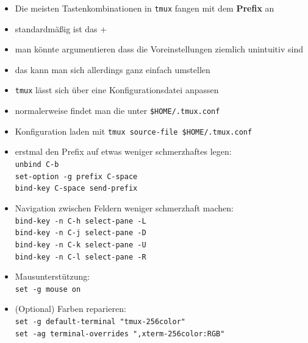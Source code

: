 \documentclass[plain]{beamer}
\newcommand{\prefix}{\Ctrl+\keystroke{b}}
\newcommand{\tmux}{\texttt{tmux}}
\begin{document}
\begin{frame}
  \begin{itemize}
    \item Die meisten Tastenkombinationen in \tmux{} fangen mit dem \textbf{Prefix} an
    \item standardmäßig ist das \prefix
    \item man könnte argumentieren dass die Voreinstellungen ziemlich unintuitiv sind
    \item das kann man sich allerdings ganz einfach umstellen
  \end{itemize}
\end{frame}

\begin{frame}
  \begin{itemize}
    \item \tmux{} lässt sich über eine Konfigurationsdatei anpassen
    \item normalerweise findet man die unter \texttt{\$HOME/.tmux.conf}
    \item Konfiguration laden mit \texttt{tmux source-file \$HOME/.tmux.conf}
  \end{itemize}
\end{frame}

\begin{frame}
  \begin{itemize}
    \item erstmal den Prefix auf etwas weniger schmerzhaftes legen: \\
    \texttt{unbind C-b \\
            set-option -g prefix C-space \\
            bind-key C-space send-prefix}

    \item Navigation zwischen Feldern weniger schmerzhaft machen: \\
    \texttt{bind-key -n C-h select-pane -L \\
            bind-key -n C-j select-pane -D \\
            bind-key -n C-k select-pane -U \\
            bind-key -n C-l select-pane -R}

    \item Mausunterstützung:\\
    \texttt{set -g mouse on}
    \item (Optional) Farben reparieren:\\
    \texttt{set -g default-terminal "tmux-256color"\\
            set -ag terminal-overrides ",xterm-256color:RGB"}
  \end{itemize}
\end{frame}
\end{document}
